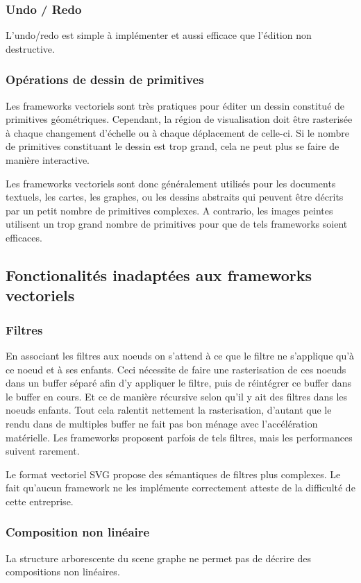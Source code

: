 			\subsubsection{Undo / Redo}
				L'undo/redo est simple à implémenter et aussi efficace que l'édition non destructive. 
			\subsubsection{Opérations de dessin de primitives}
				Les frameworks vectoriels sont très pratiques pour éditer un dessin constitué de primitives géométriques. Cependant, la région de
				visualisation doit être rasterisée à chaque changement d'échelle ou à chaque déplacement de celle-ci. Si le nombre de primitives
				constituant le dessin est trop grand, cela ne peut plus se faire de manière interactive.
				
				Les frameworks vectoriels sont donc généralement utilisés pour les documents textuels, les cartes, les graphes, ou les dessins abstraits
				qui peuvent être décrits par un petit nombre de primitives complexes. A contrario, les images peintes utilisent 
				un trop grand nombre de primitives pour que de tels frameworks soient efficaces. 
		\subsection{Fonctionalités inadaptées aux frameworks vectoriels}
			\subsubsection{Filtres}
				En associant les filtres aux noeuds on s'attend à ce que le filtre ne s'applique
				qu'à ce noeud et à ses enfants. Ceci nécessite de faire une rasterisation de ces noeuds dans un buffer séparé afin d'y appliquer le
				filtre, puis de réintégrer ce buffer dans le buffer en cours. Et ce de manière récursive selon qu'il y ait des filtres dans les
				noeuds enfants. 
				Tout cela ralentit nettement la rasterisation, d'autant que le rendu dans de multiples buffer ne fait pas bon ménage avec 
				l'accélération matérielle. Les frameworks proposent parfois de tels filtres, mais les performances suivent rarement.
				
				Le format vectoriel SVG propose des sémantiques de filtres plus complexes. Le fait qu'aucun framework ne les implémente correctement
				atteste de la difficulté de cette entreprise. 
			\subsubsection{Composition non linéaire}
				La structure arborescente du scene graphe ne permet pas de décrire des compositions non linéaires.
